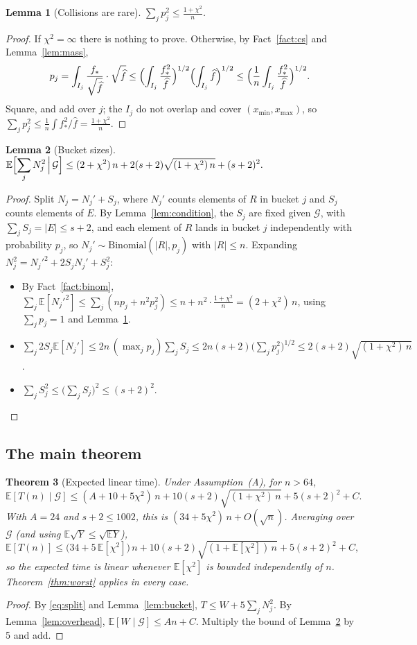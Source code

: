\documentclass[11pt]{article}
\newtheorem{theorem}{Theorem}[section]
\newtheorem{lemma}[theorem]{Lemma}
\theoremstyle{definition}
\theoremstyle{remark}
\newcommand{\fh}{\widehat{f}}
\newcommand{\E}{\mathbb{E}}
\newcommand{\xmin}{x_{\min}}
\newcommand{\xmax}{x_{\max}}
\newcommand{\G}{\mathcal{G}}
\begin{document}
\begin{lemma}[Collisions are rare]\label{lem:collide}
$\displaystyle\sum_j p_j^2\le\frac{1+\chi^2}{n}$.
\end{lemma}
\begin{proof}
If $\chi^2=\infty$ there is nothing to prove. Otherwise, by Fact~\ref{fact:cs}
and Lemma~\ref{lem:mass},
\[
p_j=\int_{I_j}\frac{f_\ast}{\sqrt{\fh}}\cdot\sqrt{\fh}
\le\Bigl(\int_{I_j}\frac{f_\ast^2}{\fh}\Bigr)^{1/2}\Bigl(\int_{I_j}\fh\Bigr)^{1/2}
\le\Bigl(\frac1n\int_{I_j}\frac{f_\ast^2}{\fh}\Bigr)^{1/2}.
\]
Square, and add over $j$; the $I_j$ do not overlap and cover
$(\xmin,\xmax)$, so $\sum_jp_j^2\le\frac1n\int f_\ast^2/\fh=\frac{1+\chi^2}{n}$.
\end{proof}

\begin{lemma}[Bucket sizes]\label{lem:moments}
$\displaystyle\E\Bigl[\sum_j N_j^2\,\Big|\,\G\Bigr]\le(2+\chi^2)\,n+2(s+2)\sqrt{(1+\chi^2)\,n}+(s+2)^2.$
\end{lemma}
\begin{proof}
Split $N_j=N_j'+S_j$, where $N_j'$ counts elements of $R$ in bucket $j$ and
$S_j$ counts elements of $E$. By Lemma~\ref{lem:condition}, the $S_j$ are
fixed given $\G$, with $\sum_jS_j=|E|\le s+2$, and each element of $R$
lands in bucket $j$ independently with probability $p_j$, so
$N_j'\sim\mathrm{Binomial}(|R|,p_j)$ with $|R|\le n$. Expanding
$N_j^2=N_j'^2+2S_jN_j'+S_j^2$:
\begin{itemize}
\item By Fact~\ref{fact:binom}, $\sum_j\E[N_j'^2]\le\sum_j(np_j+n^2p_j^2)
  \le n+n^2\cdot\frac{1+\chi^2}{n}=(2+\chi^2)\,n$, using $\sum_jp_j=1$ and
  Lemma~\ref{lem:collide}.
\item $\sum_j2S_j\E[N_j']\le2n\,(\max_jp_j)\sum_jS_j\le2n(s+2)\bigl(\sum_jp_j^2\bigr)^{1/2}
  \le2(s+2)\sqrt{(1+\chi^2)\,n}$.
\item $\sum_jS_j^2\le\bigl(\sum_jS_j\bigr)^2\le(s+2)^2$.\qedhere
\end{itemize}
\end{proof}

\subsection{The main theorem}

\begin{theorem}[Expected linear time]\label{thm:main}
Under Assumption~(A), for $n>64$,
\[
\E[T(n)\mid\G]\le(A+10+5\chi^2)\,n+10(s+2)\sqrt{(1+\chi^2)\,n}+5(s+2)^2+C .
\]
With $A=24$ and $s+2\le1002$, this is $(34+5\chi^2)\,n+O(\sqrt n)$. Averaging
over $\G$ (and using $\E\sqrt Y\le\sqrt{\E Y}$),
\[
\E[T(n)]\le\bigl(34+5\,\E[\chi^2]\bigr)\,n+10(s+2)\sqrt{(1+\E[\chi^2])\,n}+5(s+2)^2+C ,
\]
so the expected time is linear whenever $\E[\chi^2]$ is bounded
independently of $n$. Theorem~\ref{thm:worst} applies in every case.
\end{theorem}
\begin{proof}
By \eqref{eq:split} and Lemma~\ref{lem:bucket},
$T\le W+5\sum_jN_j^2$. By Lemma~\ref{lem:overhead}, $\E[W\mid\G]\le An+C$.
Multiply the bound of Lemma~\ref{lem:moments} by 5 and add.
\end{proof}
\end{document}
